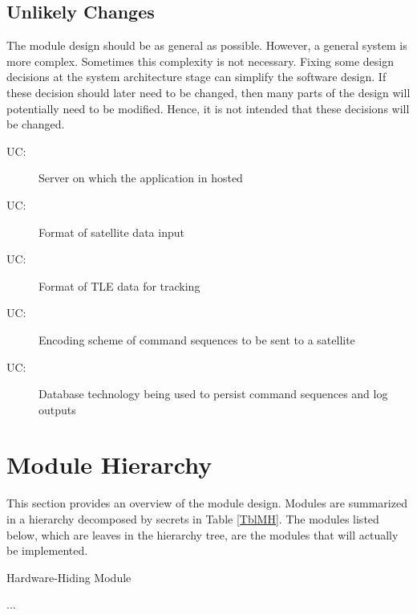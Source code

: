 \documentclass[12pt, titlepage]{article}
\newcounter{ucnum}
\newcommand{\uctheucnum}{UC\theucnum}
\newcounter{mnum}
\newcommand{\mthemnum}{M\themnum}
\begin{document}
\subsection{Unlikely Changes} \label{SecUchange}

The module design should be as general as possible. However, a general system is
more complex. Sometimes this complexity is not necessary. Fixing some design
decisions at the system architecture stage can simplify the software design. If
these decision should later need to be changed, then many parts of the design
will potentially need to be modified. Hence, it is not intended that these
decisions will be changed.

\begin{description}
\item[ \uctheucnum \label{ucIO}:] Server on which the application in hosted
\item[ \uctheucnum \label{ucIO}:] Format of satellite data input 
\item[ \uctheucnum \label{ucIO}:] Format of TLE data for tracking 
\item[ \uctheucnum \label{ucIO}:] Encoding scheme of command sequences to be sent to a satellite 
\item[ \uctheucnum \label{ucIO}:] Database technology being used to persist command sequences and log outputs 
\end{description}

\section{Module Hierarchy} \label{SecMH}

This section provides an overview of the module design. Modules are summarized
in a hierarchy decomposed by secrets in Table \ref{TblMH}. The modules listed
below, which are leaves in the hierarchy tree, are the modules that will
actually be implemented.

\begin{description}
\item [ \mthemnum \label{mHH}:] Hardware-Hiding Module
\item ...
\end{description}
\end{document}

